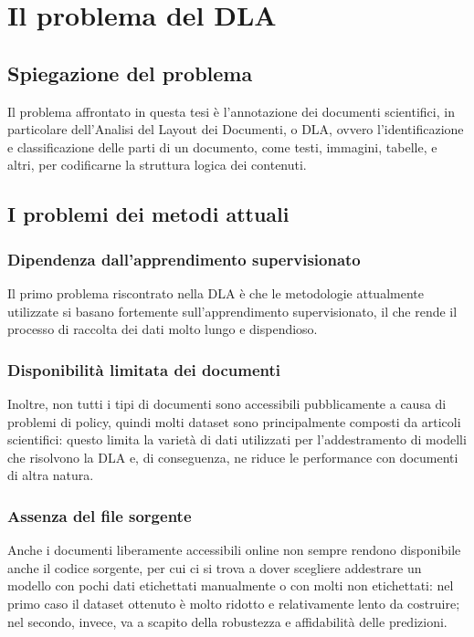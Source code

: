 \chapter{Il problema del DLA}

\section{Spiegazione del problema}
Il problema affrontato in questa tesi è l'annotazione dei documenti scientifici, in particolare dell'Analisi del Layout 
dei Documenti, o DLA, ovvero l'identificazione e classificazione delle parti di un documento, come testi, immagini,
tabelle, e altri, per codificarne la struttura logica dei contenuti.

\section{I problemi dei metodi attuali}
	\subsection{Dipendenza dall'apprendimento supervisionato}
	Il primo problema riscontrato nella DLA è che le metodologie attualmente utilizzate si basano fortemente 
	sull'apprendimento supervisionato, il che rende il processo di raccolta dei dati molto lungo e dispendioso.

	\subsection{Disponibilità limitata dei documenti}
	Inoltre, non tutti i tipi di documenti sono accessibili pubblicamente a causa di problemi di policy, quindi
	molti dataset sono principalmente composti da articoli scientifici: questo limita la varietà di dati utilizzati
	per l'addestramento di modelli che risolvono la DLA e, di conseguenza, ne riduce le performance con documenti
	di altra natura.

	\subsection{Assenza del file sorgente}
	Anche i documenti liberamente accessibili online non sempre rendono disponibile anche 
	il codice sorgente, per cui ci si trova a dover scegliere addestrare un modello con pochi dati 
	etichettati manualmente o con molti non etichettati: nel primo caso il dataset ottenuto è molto
	ridotto e relativamente lento da costruire; nel secondo, invece, va a scapito della robustezza
	e affidabilità delle predizioni.

